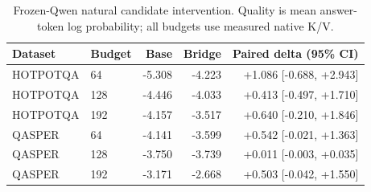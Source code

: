 \begin{table}[H]\centering\small
\begin{tabular}{llrrr}\toprule
Dataset & Budget & Base & Bridge & Paired delta (95\% CI) \\
\midrule
HOTPOTQA & 64 & -5.308 & -4.223 & +1.086 [-0.688, +2.943] \\
HOTPOTQA & 128 & -4.446 & -4.033 & +0.413 [-0.497, +1.710] \\
HOTPOTQA & 192 & -4.157 & -3.517 & +0.640 [-0.210, +1.846] \\
QASPER & 64 & -4.141 & -3.599 & +0.542 [-0.021, +1.363] \\
QASPER & 128 & -3.750 & -3.739 & +0.011 [-0.003, +0.035] \\
QASPER & 192 & -3.171 & -2.668 & +0.503 [-0.042, +1.550] \\
\bottomrule\end{tabular}
\caption{Frozen-Qwen natural candidate intervention. Quality is mean answer-token log probability; all budgets use measured native K/V.}
\label{tab:paper1-natural}
\end{table}
